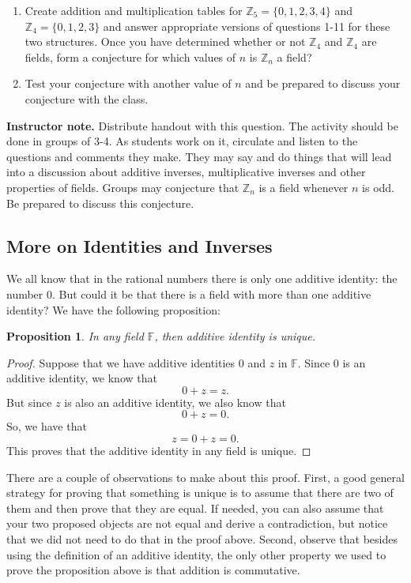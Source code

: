 \documentclass[11pt]{article}
\newcommand\smallnote[1]
	{\begin{mdframed}\raggedright  {\bf Instructor note.} {#1} \end{mdframed}}
\newenvironment{task}
	{\begin{mdframed}[linecolor=lightgray, linewidth=3pt]\raggedright}
	{\end{mdframed}}
\newtheorem{proposition}[theorem]{Proposition}
\theoremstyle{definition}
\begin{document}
\begin{task}
\begin{enumerate}
      \item Create addition and multiplication tables for $\mathbb{Z}_5 = \{0,1,2,3,4\}$ and $\mathbb{Z}_4=\{0,1,2,3\}$ and answer
        appropriate versions of questions 1-11 for these two structures. Once you have determined whether or not $\mathbb{Z}_4$ and 
        $\mathbb{Z}_4$ are fields, form a conjecture for which values of $n$ is $\mathbb{Z}_n$ a field?
      \item Test your conjecture with another value of $n$ and be prepared to discuss your conjecture with the class.
    \end{enumerate}
\end{task}

\smallnote{
Distribute handout with this question. The activity should be done in groups of 3-4. As students work on it, circulate and listen to the 
questions and comments they make. They may say and do things that will lead into a discussion about additive inverses, multiplicative 
inverses and other properties of fields. Groups may conjecture that $\mathbb{Z}_n$ is a field whenever $n$ is odd. Be prepared to discuss
this conjecture.} 

\subsection{More on Identities and Inverses}

We all know that in the rational numbers there is only one additive identity: the number 0. But could it be that there is a field with more than one
additive identity? We have the following proposition:

\begin{proposition}
  In any field $\mathbb{F}$, then additive identity is unique.
\end{proposition}
\begin{proof}
  Suppose that we have additive identities $0$ and $z$ in $\mathbb{F}$. Since $0$ is an additive identity, we know that
  \[ 0 + z = z.\]
  But since $z$ is also an additive identity, we also know that
  \[ 0 + z = 0.\]
  So, we have that
  \[ z = 0 + z = 0.\]
  This proves that the additive identity in any field is unique.
\end{proof}

There are a couple of observations to make about this proof. First, a good general strategy for proving that something is unique is to assume that there are
two of them and then prove that they are equal.  If needed, you can also assume that your two proposed objects are not equal and derive a contradiction, but
notice that we did not need to do that in the proof above. Second, observe that besides using the definition of an additive identity, the only other property we
used to prove the proposition above is that addition is commutative.
\end{document}
